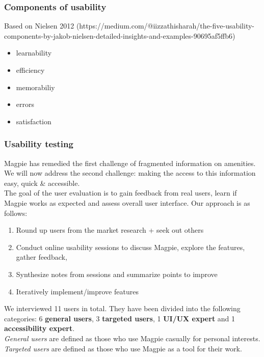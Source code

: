 \subsubsection{Components of usability}
Based on Nielsen 2012 (https://medium.com/@iizzathisharah/the-five-usability-components-by-jakob-nielsen-detailed-insights-and-examples-90695af5ffb6)

\begin{itemize}
    \item learnability
    \item efficiency
    \item memorabiliy
    \item errors
    \item satisfaction
\end{itemize}

\newpage
\subsubsection{Usability testing}
\sloppy
Magpie has remedied the first challenge of fragmented information on amenities.\\
We will now address the second challenge: making the access to this information easy, quick \& accessible.\\

\noindent The goal of the user evaluation is to gain feedback from real users, learn if Magpie works as expected and assess overall user interface. Our approach is as follows:
\begin{enumerate}
    \item Round up users from the market research + seek out others
    \item Conduct online usability sessions to discuss Magpie, explore the features, gather feedback,
    \item Synthesize notes from sessions and summarize points to improve
    \item Iteratively implement/improve features
\end{enumerate}
We interviewed 11 users in total. They have been divided into the following categories: 6 \textbf{general users}, 3 \textbf{targeted users}, 1 \textbf{UI/UX expert} and 1 \textbf{accessibility expert}.\\
\emph{General users} are defined as those who use Magpie casually for personal interests.\\ \emph{Targeted users} are defined as those who use Magpie as a tool for their work.

